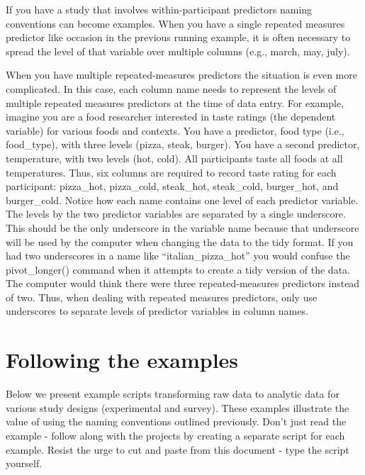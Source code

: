 \documentclass[
]{krantz}
\begin{document}
If you have a study that involves within-participant predictors naming conventions can become examples. When you have a single repeated measures predictor like occasion in the previous running example, it is often necessary to spread the level of that variable over multiple columns (e.g., march, may, july).

When you have multiple repeated-measures predictors the situation is even more complicated. In this case, each column name needs to represent the levels of multiple repeated measures predictors at the time of data entry. For example, imagine you are a food researcher interested in taste ratings (the dependent variable) for various foods and contexts. You have a predictor, food type (i.e., food\_type), with three levels (pizza, steak, burger). You have a second predictor, temperature, with two levels (hot, cold). All participants taste all foods at all temperatures. Thus, six columns are required to record taste rating for each participant: pizza\_hot, pizza\_cold, steak\_hot, steak\_cold, burger\_hot, and burger\_cold. Notice how each name contains one level of each predictor variable. The levels by the two predictor variables are separated by a single underscore. This should be the only underscore in the variable name because that underscore will be used by the computer when changing the data to the tidy format. If you had two underscores in a name like ``italian\_pizza\_hot'' you would confuse the pivot\_longer() command when it attempts to create a tidy version of the data. The computer would think there were three repeated-measures predictors instead of two. Thus, when dealing with repeated measures predictors, only use underscores to separate levels of predictor variables in column names.

\hypertarget{following-the-examples}{%
\section{Following the examples}\label{following-the-examples}}

Below we present example scripts transforming raw data to analytic data for various study designs (experimental and survey). These examples illustrate the value of using the naming conventions outlined previously. Don't just read the example - follow along with the projects by creating a separate script for each example. Resist the urge to cut and paste from this document - type the script yourself.
\end{document}
